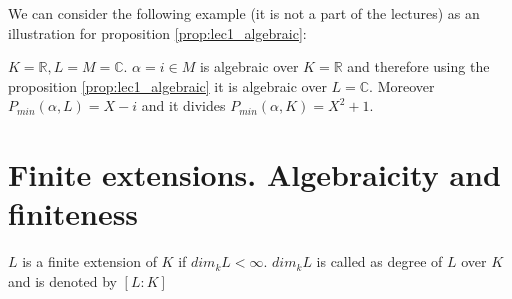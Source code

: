 We can consider the following example (it is not a part of the
lectures) as an illustration for proposition \ref{prop:lec1_algebraic}:
\begin{example}
  $K = \mathbb{R}, L=M=\mathbb{C}$. $\alpha = i \in M$ is algebraic
  over $K = \mathbb{R}$ and therefore using the proposition
  \ref{prop:lec1_algebraic} it is
  algebraic over $L = \mathbb{C}$. Moreover $P_{min}(\alpha, L) = X
  -i$ and it divides $P_{min}(\alpha, K) = X^2 + 1$.
\end{example}

\section{Finite extensions. Algebraicity and finiteness}

\begin{definition}
  $L$ is a finite extension of $K$ if $dim_k L < \infty$. $dim_k L$ is
  called as degree of $L$ over $K$ and is denoted by
  $\left[L:K\right]$
  \label{def:finiteextension}
\end{definition}


